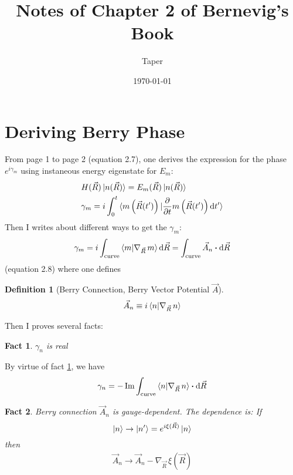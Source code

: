 \documentclass{article}
\title{Notes of Chapter 2 of Bernevig's Book}
\date{\today}
\author{Taper}
\numberwithin{equation}{subsection} %
\newtheorem{defi}{Definition}[section]
\newtheorem{fact}{Fact}[section]
\theoremstyle{definition}
\begin{document}
\maketitle
{}
\tableofcontents

\section{Deriving Berry Phase}
\label{sec:Deriving-Berry-Phase}
From page 1 to page 2 (equation 2.7), one derives the expression for
the phase $e^{i\gamma_m}$ using instaneous energy eigenstate for
$E_m$:
\begin{align}
    & H(\vec{R})\ket{n(\vec{R})} = E_m(\vec{R})\ket{n(\vec{R})} \\
    & \gamma_m = i\int_0^t
    \braket{
        m\left(\vec{R}(t')\right)|\frac{\partial }{\partial t}
        m\left(\vec{R}(t')\right) \dd t' }
\end{align}
Then I writes about different ways to get the $\gamma_m$:
\begin{align}
    \gamma_m = i\int_{\text{curve}}\braket{m|\nabla_{\vec{R}}\, m }
    \dd \vec{R}
    = \int_{\text{curve}} \vec{A}_n \vdot\dd \vec{R}
\end{align}
(equation 2.8) 
where one defines
\begin{defi}[Berry Connection, Berry Vector Potential $\vec{A}$]
    \begin{align}
        \vec{A}_n \equiv i \braket{n|\nabla_{\vec{R}}\, n }
    \end{align}
\end{defi}
Then I proves several facts:
\begin{fact}
    \label{fact:gamma_is_real}
        $\gamma_n$ is real
\end{fact}
By virtue of fact \ref{fact:gamma_is_real}, we have
\begin{align}
    \gamma_n = -\Im \int_\text{curve} \braket{ n|\nabla_{\vec{R}}\,n}
    \vdot \dd \vec{R} 
\end{align}
\begin{fact}
    Berry connection $\vec{A}_n$ is gauge-dependent.
    The dependence is: If 
    $$\ket{n}\to \ket{n'}= e^{i\xi(\vec{R})}\ket{n}$$
    then
    \begin{align}
        \vec{A}_n \to \vec{A}_n - \nabla_{\vec{R}}\,\xi(\vec{R})
    \end{align}
\end{fact}
\end{document}
